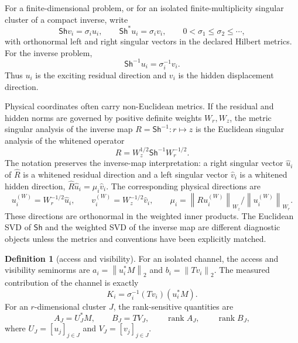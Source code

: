 \documentclass[review]{siamart220329}
\theoremstyle{definition}
\newtheorem{definition}[theorem]{Definition}
\theoremstyle{remark}
\newcommand{\Sh}{\mathsf{Sh}}
\newcommand{\rank}{\operatorname{rank}}
\newcommand{\norm}[1]{\left\lVert #1\right\rVert}
\begin{document}
For a finite-dimensional problem, or for an isolated finite-multiplicity singular cluster of a compact inverse, write
\begin{equation}
    \Sh v_i=\sigma_i u_i,
    \qquad
    \Sh^*u_i=\sigma_i v_i,
    \qquad
    0<\sigma_1\leq\sigma_2\leq\cdots,
    \label{eq:svd}
\end{equation}
with orthonormal left and right singular vectors in the declared Hilbert metrics. For the inverse problem,
\begin{equation}
    \Sh^{-1}u_i=\sigma_i^{-1}v_i.
    \label{eq:inverse-action}
\end{equation}
Thus $u_i$ is the exciting residual direction and $v_i$ is the hidden displacement direction.

Physical coordinates often carry non-Euclidean metrics. If the residual and hidden norms are governed by positive definite weights $W_r,W_z$, the metric singular analysis of the inverse map $R=\Sh^{-1}:r\mapsto z$ is the Euclidean singular analysis of the whitened operator
\begin{equation}
    \widehat R=W_z^{1/2}\Sh^{-1}W_r^{-1/2}.
    \label{eq:weighted-resolvent}
\end{equation}
The notation preserves the inverse-map interpretation: a right singular vector $\widehat u_i$ of $\widehat R$ is a whitened residual direction and a left singular vector $\widehat v_i$ is a whitened hidden direction, $\widehat R\widehat u_i=\mu_i\widehat v_i$. The corresponding physical directions are
\begin{equation}
    u_i^{(W)}=W_r^{-1/2}\widehat u_i,
    \qquad
    v_i^{(W)}=W_z^{-1/2}\widehat v_i,
    \qquad
    \mu_i=\norm{R u_i^{(W)}}_{W_z}/\norm{u_i^{(W)}}_{W_r}.
    \label{eq:weighted-physical-vectors}
\end{equation}
These directions are orthonormal in the weighted inner products. The Euclidean SVD of $\Sh$ and the weighted SVD of the inverse map are different diagnostic objects unless the metrics and conventions have been explicitly matched.

\begin{definition}[access and visibility]
For an isolated channel, the access and visibility seminorms are $a_i=\norm{u_i^*M}_2$ and $b_i=\norm{Tv_i}_2$. The measured contribution of the channel is exactly
\begin{equation}
    K_i=\sigma_i^{-1}(Tv_i)(u_i^*M).
    \label{eq:rank-one-contribution}
\end{equation}
For an $r$-dimensional cluster $J$, the rank-sensitive quantities are
\begin{equation}
    A_J=U_J^*M,
    \qquad B_J=TV_J,
    \qquad \rank A_J,
    \qquad \rank B_J,
    \label{eq:cluster-access-visibility}
\end{equation}
where $U_J=[u_j]_{j\in J}$ and $V_J=[v_j]_{j\in J}$.
\end{definition}
\end{document}
